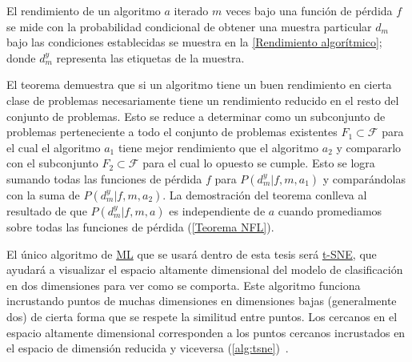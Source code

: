 El rendimiento de un algoritmo \(a\) iterado \( m\) veces bajo una función de pérdida
\(f\) se mide con la probabilidad condicional de obtener una muestra particular
\(d_{m}\) bajo las condiciones establecidas se muestra en la \autoref{Rendimiento
algorítmico}; donde \(d^{y}_{m}\) representa las etiquetas de la muestra. 

\begin{minipage}{\textwidth}
\end{minipage}

El teorema demuestra que si un algoritmo tiene un buen rendimiento en cierta
clase de problemas necesariamente tiene un rendimiento reducido en el resto
del conjunto de problemas. Esto se reduce a determinar como un subconjunto de
problemas perteneciente a todo el conjunto de problemas existentes \(F_{1}
\subset \mathcal{F}\) para el cual el algoritmo \(a_{1}\) tiene mejor rendimiento
que el algoritmo \(a_{2}\) y compararlo con el subconjunto \(F_{2} \subset
\mathcal{F}\) para el cual lo opuesto se cumple. Esto se logra sumando todas las
funciones de pérdida \(f\) para \(P(d^{y}_{m} | f, m ,a_{1})\) y comparándolas con
la suma de \(P(d^{y}_{m} | f, m ,a_{2})\). La demostración del teorema conlleva al
resultado de que \(P(d^{y}_{m} | f, m ,a)\) es independiente de \(a\) cuando
promediamos sobre todas las funciones de pérdida (\autoref{Teorema
NFL})\cite{Wolpert1996}.


\begin{minipage}{\textwidth}
    El único algoritmo de \hyperlink{abbr}{ML} que se usará dentro de esta tesis
será \hyperlink{abbr}{t-SNE}, que ayudará a visualizar el espacio altamente
dimensional del modelo de clasificación en dos dimensiones para ver como se
comporta. Este algoritmo funciona incrustando puntos de muchas dimensiones en
dimensiones bajas (generalmente dos) de cierta forma que se respete la similitud
entre puntos. Los cercanos en el espacio altamente dimensional corresponden a
los puntos cercanos incrustados en el espacio de dimensión reducida y viceversa
(\autoref{alg:tsne})~\cite{VanderMaaten2008}\cite{VanderMaaten2013}.

\end{minipage}

